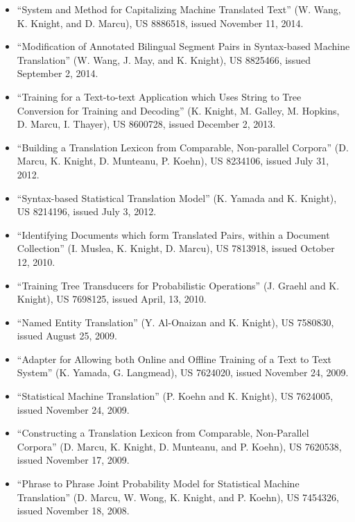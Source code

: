 \begin{itemize}
\item ``System and Method for Capitalizing Machine Translated Text'' (W. Wang, K. Knight, and D. Marcu), 
US 8886518, issued November 11, 2014.

\item ``Modification of Annotated Bilingual Segment Pairs in Syntax-based Machine Translation'' (W. Wang, J. May, and K. Knight), 
US 8825466, issued September 2, 2014.

\item ``Training for a Text-to-text Application which Uses String to Tree Conversion for Training and Decoding'' (K. Knight, M. Galley, M. Hopkins, D. Marcu, I. Thayer), 
US 8600728, issued December 2, 2013.

\item ``Building a Translation Lexicon from Comparable, Non-parallel Corpora'' (D. Marcu, K. Knight, D. Munteanu, P. Koehn), 
US 8234106, issued July 31, 2012. 

\item ``Syntax-based Statistical Translation Model'' (K. Yamada and K. Knight),
US 8214196, issued July 3, 2012. 

\item ``Identifying Documents which form Translated Pairs, within a Document Collection'' (I. Muslea, K. Knight, D. Marcu),
US 7813918, issued October 12, 2010.

\item ``Training Tree Transducers for Probabilistic Operations'' (J. Graehl and K. Knight),
US 7698125, issued April, 13, 2010.

\item ``Named Entity Translation'' (Y. Al-Onaizan and K. Knight),
US 7580830, issued August 25, 2009.

\item ``Adapter for Allowing both Online and Offline Training of a
Text to Text System'' (K. Yamada, G. Langmead),
US 7624020, issued November 24, 2009.

\item ``Statistical Machine Translation'' (P. Koehn and K. Knight),
US 7624005, issued November 24, 2009.

\item ``Constructing a Translation Lexicon from Comparable, Non-Parallel
Corpora'' (D. Marcu, K. Knight, D. Munteanu, and P. Koehn),
US 7620538, issued November 17, 2009.

\item ``Phrase to Phrase Joint Probability Model for Statistical 
Machine Translation'' (D. Marcu, W. Wong, K. Knight, and P. Koehn),
US 7454326, issued November 18, 2008.


\end{itemize}
